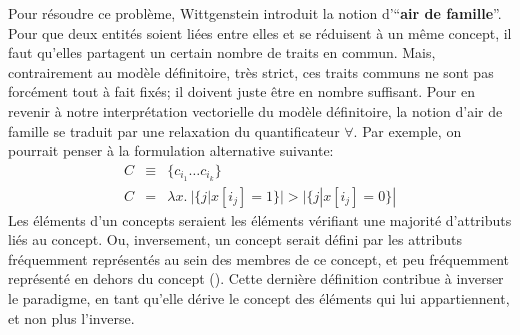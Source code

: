 \documentclass[french]{article}
\begin{document}
				Pour résoudre ce problème, Wittgenstein introduit la notion d'``\textbf{air de famille}''. Pour que deux entités soient liées entre elles et se réduisent à un même concept, il faut qu'elles partagent un certain nombre de traits en commun. Mais, contrairement au modèle définitoire, très strict, ces traits communs ne sont pas forcément tout à fait fixés; il doivent juste être en nombre suffisant. Pour en revenir à notre interprétation vectorielle du modèle définitoire, la notion d'air de famille se traduit par une relaxation du quantificateur $\forall$. Par exemple, on pourrait penser à la formulation alternative suivante:
				\begin{eqnarray*}
				C &\equiv&  \lbrace c_{i_1} \dots c_{i_k} \rbrace \\
				C &=& \lambda x. \ |\lbrace j | x[i_j] = 1 \rbrace| > |\lbrace j | x[i_j] = 0 \rbrace|
				\end{eqnarray*}
				Les éléments d'un concepts seraient les éléments vérifiant une majorité d'attributs liés au concept. Ou, inversement, un concept serait défini par les attributs fréquemment représentés au sein des membres de ce concept, et peu fréquemment représenté en dehors du concept (\cite{rosch1975}). Cette dernière définition contribue à inverser le paradigme, en tant qu'elle dérive le concept des éléments qui lui appartiennent, et non plus l'inverse.\\
				
\end{document}
